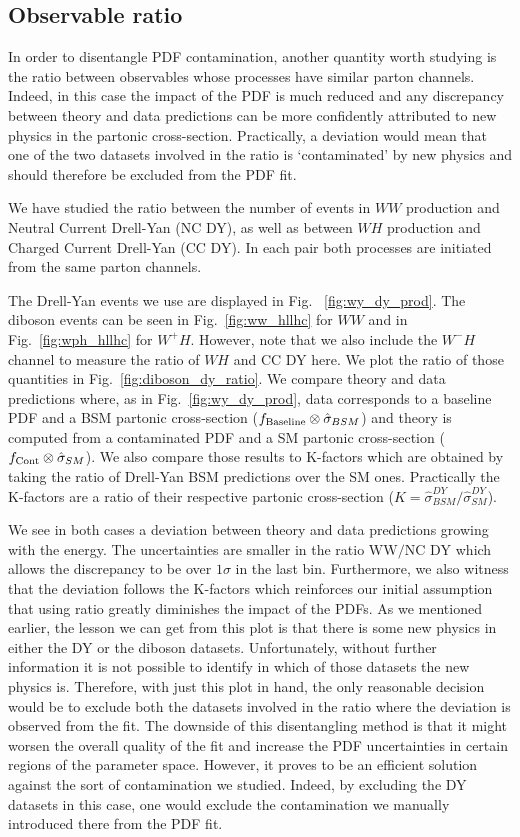 \documentclass[withindex,glossary]{cam-thesis}
\begin{document}
\subsection{Observable ratio}
\label{subsec:ratio}
In order to disentangle PDF contamination, another quantity worth studying is the ratio between observables whose processes have similar parton channels. Indeed, in this case the impact of the PDF is much reduced and any discrepancy between theory and data predictions can be more confidently attributed to new physics in the partonic cross-section. Practically, a deviation would mean that one of the two datasets involved in the ratio is `contaminated' by new physics and should therefore be excluded from the PDF fit. 

%
We have studied the ratio between the number of events in $WW$ production and Neutral Current Drell-Yan (NC DY), as well as between $WH$ production and Charged Current Drell-Yan (CC DY). In each pair both processes are initiated from the same parton channels. 
%

The Drell-Yan events we use are displayed in Fig. ~\ref{fig:wy_dy_prod}. The diboson events can be seen in Fig.~\ref{fig:ww_hllhc} for $WW$ and in Fig.~\ref{fig:wph_hllhc} for $W^{+}H$. However, note that we also include the $W^{-}H$ channel to measure the ratio of $WH$ and CC DY here. We plot the ratio of those quantities in Fig.~\ref{fig:diboson_dy_ratio}. We compare theory and data predictions where, as in Fig.~\ref{fig:wy_dy_prod}, data corresponds to a baseline PDF and a BSM partonic cross-section ($f_{\rm Baseline} \otimes \hat{\sigma} _{BSM}$) and theory is computed from a contaminated PDF and a SM partonic cross-section ($f_{\rm Cont} \otimes \hat{\sigma}_{SM}$). We also compare those results to K-factors which are obtained by taking the ratio of Drell-Yan BSM predictions over the SM ones. Practically the K-factors are a ratio of their respective partonic cross-section ($K = \hat{\sigma}^{DY} _{BSM} / \hat{\sigma}^{DY} _{SM}$).

We see in both cases a deviation between theory and data predictions growing with the energy. The uncertainties are smaller in the ratio $\text{WW} / \text{NC DY}$ which allows the discrepancy to be over $1 \sigma$ in the last bin. Furthermore, we also witness that the deviation follows the K-factors which reinforces our initial assumption that using ratio greatly diminishes the impact of the PDFs.
%
As we mentioned earlier, the lesson we can get from this plot is that there is some new physics in either the DY or the diboson datasets. Unfortunately, without further information it is not possible to identify in which of those datasets the new physics is. Therefore, with just this plot in hand, the only reasonable decision would be to exclude both the datasets involved in the ratio where the deviation is observed from the fit. The downside of this disentangling method is that it might worsen the overall quality of the fit and increase the PDF uncertainties in certain regions of the parameter space. However, it proves to be an efficient solution against the sort of contamination we studied. Indeed, by excluding the DY datasets in this case, one would exclude the contamination we manually introduced there from the PDF fit.
\end{document}
